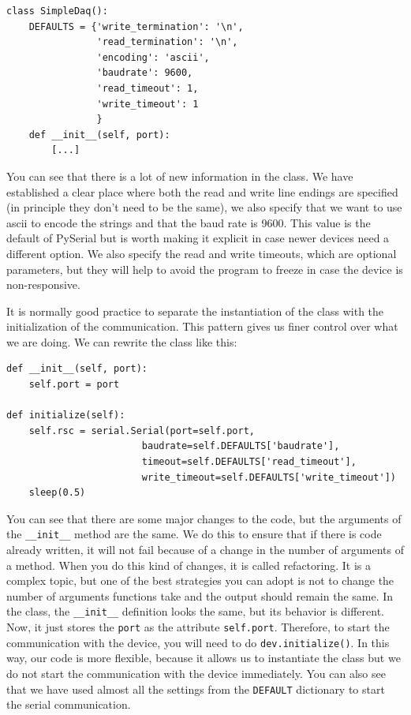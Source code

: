\begin{verbatim}
class SimpleDaq():
    DEFAULTS = {'write_termination': '\n',
                'read_termination': '\n',
                'encoding': 'ascii',
                'baudrate': 9600,
                'read_timeout': 1,
                'write_timeout': 1
                }
    def __init__(self, port):
        [...]
\end{verbatim}

You can see that there is a lot of new information in the class. We have established a clear place where both the read and write line endings are specified (in principle they don't need to be the same), we also specify that we want to use ascii to encode the strings and that the baud rate is 9600. This value is the default of PySerial but is worth making it explicit in case newer devices need a different option. We also specify the read and write timeouts, which are optional parameters, but they will help to avoid the program to freeze in case the device is non-responsive. 

It is normally good practice to separate the instantiation of the class with the initialization of the communication. This pattern gives us finer control over what we are doing. We can rewrite the class like this:

\begin{verbatim}
def __init__(self, port):
    self.port = port

def initialize(self):
    self.rsc = serial.Serial(port=self.port,
                        baudrate=self.DEFAULTS['baudrate'],
                        timeout=self.DEFAULTS['read_timeout'],
                        write_timeout=self.DEFAULTS['write_timeout'])
    sleep(0.5)
\end{verbatim}

You can see that there are some major changes to the code, but the
arguments of the \texttt{__init__} method are the same. We do this
to ensure that if there is code already written, it will not fail
because of a change in the number of arguments of a method. When you do this kind of changes, it is called refactoring. It is a complex topic, but one of the best strategies you can adopt is not to change the number of arguments functions take and the output should remain the same. In the class, the \texttt{__init__} definition looks the same, but its behavior is different. Now, it just stores the
\texttt{port} as the attribute \texttt{self.port}. Therefore, to
start the communication with the device, you will need to do
\texttt {dev.initialize()}. In this way, our code is more flexible,
because it allows us to instantiate the class but we do not start the communication with the device immediately. You can also see that we have
used almost all the settings from the \texttt{DEFAULT} dictionary to
start the serial communication.

